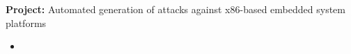\documentclass[../../../main.tex]{subfiles}
\begin{document}
  \renewcommand{\notesDate}{DATE_REPLACE}
	\notesTitle




    \textbf{Project:} Automated generation of attacks against x86-based
     embedded system platforms
      \begin{itemize}
        \item
      \end{itemize}

	\notesEnd
\end{document}
